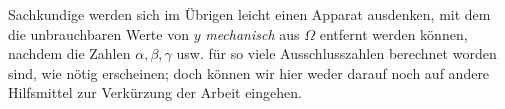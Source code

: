 Sachkundige werden sich im Übrigen leicht einen Apparat ausdenken, mit dem die unbrauchbaren Werte von \(y\) \textit{mechanisch} aus \(\Omega\) entfernt werden können, nachdem die Zahlen \(\alpha,\allowbreak \beta,\allowbreak \gamma\) usw. für so viele Ausschlusszahlen berechnet worden sind, wie nötig erscheinen; doch können wir hier weder darauf noch auf andere Hilfsmittel zur Verkürzung der Arbeit eingehen.
